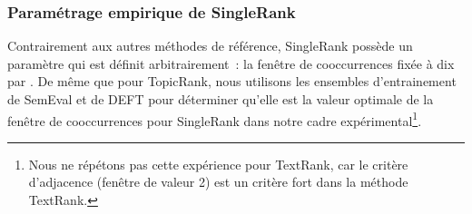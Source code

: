       \subsubsection{Paramétrage empirique de SingleRank}
      \label{subsubsec:main-automatic_keyphrase_annotation-unsupervised_automatic_keyphrase_extraction-evaluation-empirical_setting_of_singlerank}
        Contrairement aux autres méthodes de référence, SingleRank possède un
        paramètre qui est définit arbitrairement~: la fenêtre de cooccurrences
        fixée à dix par . De même que pour TopicRank,
        nous utilisons les ensembles d'entrainement de SemEval et de DEFT pour
        déterminer qu'elle est la valeur optimale de la fenêtre de cooccurrences
        pour SingleRank dans notre cadre expérimental\footnote{Nous ne répétons
        pas cette expérience pour TextRank, car le critère d'adjacence
        (fenêtre de valeur 2) est un critère fort dans la méthode TextRank.}.

